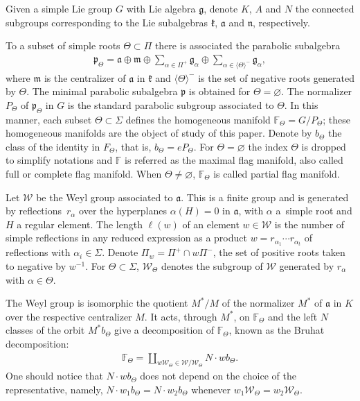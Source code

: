 \documentclass[10pt,a4paper]{amsart}
\numberwithin{equation}{section}
\begin{document}
Given a simple Lie group $G$ with Lie algebra $\mathfrak{g}$, denote $K$, $A$ and $N$ the connected subgroups corresponding to the Lie subalgebras $\mathfrak{k}$, $\mathfrak{a}$ and $\mathfrak{n}$, respectively.

To a subset of simple roots $\Theta \subset \Pi $ there is associated the parabolic subalgebra
\begin{gather*}
\mathfrak{p}_{\Theta }=\mathfrak{a}\oplus \mathfrak{m}\oplus \sum_{\alpha \in \Pi ^{+}}\mathfrak{g}_{\alpha }\oplus \sum_{\alpha \in \langle\Theta\rangle ^{-}}\mathfrak{g}_{\alpha },
\end{gather*}
where $\mathfrak{m}$ is the centralizer of $\mathfrak{a}$ in $\mathfrak{k}$ and $\langle\Theta\rangle ^{-}$ is the set of negative roots generated by $\Theta $. The minimal parabolic subalgebra $\mathfrak{p}$ is obtained for $\Theta =\varnothing $. The normalizer $P_{\Theta }$ of $\mathfrak{p}_{\Theta }$ in $G$ is the standard parabolic subgroup associated to $\Theta $. In this manner, each subset $\Theta \subset \Sigma $ defines the homogeneous manifold $\mathbb{F}_{\Theta }=G/P_{\Theta }$; these homogeneous manifolds are the object of study of this paper. Denote by $b_{\Theta }$ the class of the identity in $F_{\Theta }$, that is, $b_{\Theta }=eP_{\Theta }$. For $\Theta =\varnothing $ the index $\Theta $ is dropped to simplify notations and $\mathbb{F}$ is referred as the maximal flag manifold, also called full or complete flag manifold. When $\Theta \neq \varnothing $, $\mathbb{F}_{\Theta }$ is called partial flag manifold.

Let $\mathcal{W}$ be the Weyl group associated to $\mathfrak{a}$. This is a finite group and is generated by reflec\-tions~$r_{\alpha }$ over the hyperplanes $\alpha (H) =0$ in $\mathfrak{a}$, with $\alpha $ a~simple root and $H$ a regular element. The length $\ell (w)$ of an element $w\in \mathcal{W}$ is the number of simple reflections in any reduced expression as a product $w=r_{\alpha _{1}}\cdots r_{\alpha _{t}}$ of reflections with $\alpha _{i}\in \Sigma $. Denote $\Pi _{w}=\Pi ^{+}\cap w\Pi ^{-}$, the set of positive roots taken to negative by $w^{-1}$. For $\Theta \subset \Sigma $, $\mathcal{W}_{\Theta }$ denotes the subgroup of $\mathcal{W}$ generated by $r_{\alpha} $ with $\alpha \in \Theta $.

The Weyl group is isomorphic the quotient $M^*/M$ of the normalizer $M^*$ of $\mathfrak{a }$ in $K$ over the respective centralizer $M$. It acts, through $M^*$, on $\mathbb{F}_\Theta$ and the left $N$ classes of the orbit $M^* b_\Theta$ give a decomposition of $\mathbb{F}_\Theta$, known as the Bruhat decomposition:
\begin{gather*}
\mathbb{F}_\Theta=\coprod_{w\mathcal{W}_\Theta \in \mathcal{W}/\mathcal{W}_\Theta}N\cdot w b_\Theta.
\end{gather*}
One should notice that $N\cdot w b_\Theta$ does not depend on the choice of the representative, namely, $N\cdot w_1 b_\Theta=N\cdot w_2 b_\Theta$ whenever $w_1\mathcal{W}_\Theta =w_2\mathcal{W}_\Theta$.
\end{document}
